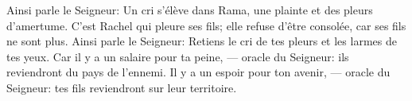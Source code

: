 Ainsi parle le Seigneur:
	Un cri s’élève dans Rama, une plainte et des pleurs d’amertume.
C’est Rachel qui pleure ses fils;
	elle refuse d’être consolée, car ses fils ne sont plus.
Ainsi parle le Seigneur:
	Retiens le cri de tes pleurs et les larmes de tes yeux.
Car il y a un salaire pour ta peine, --- oracle du Seigneur:
	ils reviendront du pays de l’ennemi.
Il y a un espoir pour ton avenir, --- oracle du Seigneur:
	tes fils reviendront sur leur territoire.
